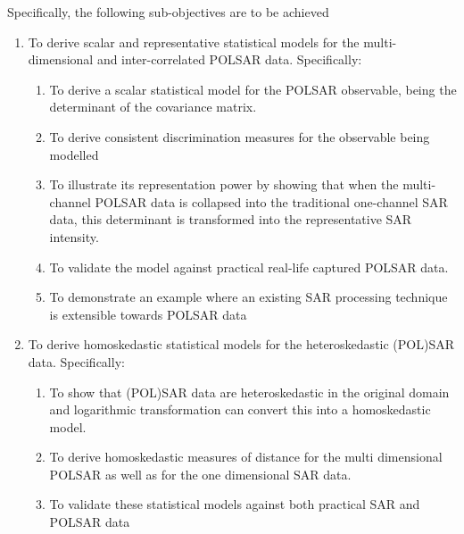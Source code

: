 Specifically, the following sub-objectives are to be achieved
\begin{enumerate}
\item                 To derive scalar and representative statistical models
                for the multi-dimensional and inter-correlated POLSAR
                data. Specifically:
                \begin{enumerate}
                \item \label{itm:polsar_model} To derive a scalar statistical model for the
                POLSAR observable, being the determinant of the
                covariance matrix.
                \item \label{itm:polsar_discrimination_measure} To derive consistent discrimination measures for
                the observable being modelled 
                \item \label{itm:polsar_include_sar} To illustrate its representation power by showing
                that when the multi-channel POLSAR data is collapsed
                into the traditional one-channel SAR data, this
                determinant is transformed into the representative SAR
                intensity.
                \item \label{itm:polsar_validation} To validate the model against practical real-life
                captured POLSAR data.
                \item \label{itm:extend_sar_to_polsar} To demonstrate an example where an existing SAR
                processing technique is extensible towards POLSAR data
                \end{enumerate}
\item                To derive homoskedastic statistical models for the
                heteroskedastic (POL)SAR data.  Specifically:
                \begin{enumerate}
                \item \label{itm:log_transform} To show that (POL)SAR data are heteroskedastic in
                the original domain and logarithmic transformation
                can convert this into a homoskedastic model.
                \item \label{itm:sar_measures_distance} To derive homoskedastic measures of distance for
                the multi dimensional POLSAR as well as for the one
                dimensional SAR data.
                \item \label{itm:sar_validation} To validate these statistical models against both
                practical SAR and POLSAR data

\end{enumerate}
\end{enumerate}
